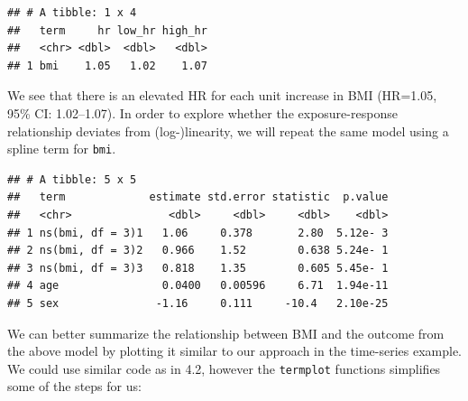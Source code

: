 \documentclass[
]{book}
\newenvironment{Shaded}{\begin{snugshade}}{\end{snugshade}}
\newcommand{\DataTypeTok}[1]{\textcolor[rgb]{0.13,0.29,0.53}{#1}}
\newcommand{\DecValTok}[1]{\textcolor[rgb]{0.00,0.00,0.81}{#1}}
\newcommand{\KeywordTok}[1]{\textcolor[rgb]{0.13,0.29,0.53}{\textbf{#1}}}
\newcommand{\NormalTok}[1]{#1}
\newcommand{\OperatorTok}[1]{\textcolor[rgb]{0.81,0.36,0.00}{\textbf{#1}}}
\newcommand{\StringTok}[1]{\textcolor[rgb]{0.31,0.60,0.02}{#1}}
\begin{document}
\begin{verbatim}
## # A tibble: 1 x 4
##   term     hr low_hr high_hr
##   <chr> <dbl>  <dbl>   <dbl>
## 1 bmi    1.05   1.02    1.07
\end{verbatim}

We see that there is an elevated HR for each unit increase in BMI (HR=1.05, 95\% CI: 1.02--1.07). In order to explore whether the exposure-response relationship deviates from (log-)linearity, we will repeat the same model using a spline term for \texttt{bmi}.

\begin{Shaded}
\end{Shaded}

\begin{verbatim}
## # A tibble: 5 x 5
##   term             estimate std.error statistic  p.value
##   <chr>               <dbl>     <dbl>     <dbl>    <dbl>
## 1 ns(bmi, df = 3)1   1.06     0.378       2.80  5.12e- 3
## 2 ns(bmi, df = 3)2   0.966    1.52        0.638 5.24e- 1
## 3 ns(bmi, df = 3)3   0.818    1.35        0.605 5.45e- 1
## 4 age                0.0400   0.00596     6.71  1.94e-11
## 5 sex               -1.16     0.111     -10.4   2.10e-25
\end{verbatim}

We can better summarize the relationship between BMI and the outcome from the above model by plotting it similar to our approach in the time-series example. We could use similar code as in 4.2, however the \texttt{termplot} functions simplifies some of the steps for us:
\end{document}
